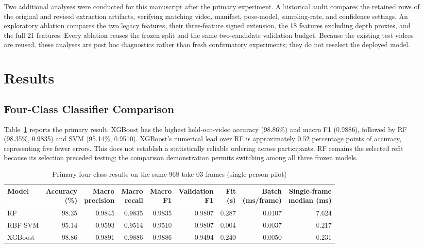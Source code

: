 \documentclass[conference]{IEEEtran}
\newcommand{\smalltable}{\setlength{\tabcolsep}{3.5pt}\renewcommand{\arraystretch}{1.12}\footnotesize}
\begin{document}
Two additional analyses were conducted for this manuscript after the primary experiment. A historical audit compares the retained rows of the original and revised extraction artifacts, verifying matching video, manifest, pose-model, sampling-rate, and confidence settings. An exploratory ablation compares the two legacy features, their three-feature signed extension, the 18 features excluding depth proxies, and the full 21 features. Every ablation reuses the frozen split and the same two-candidate validation budget. Because the existing test videos are reused, these analyses are post hoc diagnostics rather than fresh confirmatory experiments; they do not reselect the deployed model.

\section{Results}
\subsection{Four-Class Classifier Comparison}
Table~\ref{tab:performance} reports the primary result. XGBoost has the highest held-out-video accuracy (98.86\%) and macro F1 (0.9886), followed by RF (98.35\%, 0.9835) and SVM (95.14\%, 0.9510). XGBoost's numerical lead over RF is approximately 0.52 percentage points of accuracy, representing five fewer errors. This does not establish a statistically reliable ordering across participants. RF remains the selected refit because its selection preceded testing; the comparison demonstration permits switching among all three frozen models.

\begin{table}[t]\caption{Primary four-class results on the same 968 take-03 frames (single-person pilot)}\label{tab:performance}\centering\smalltable
\begin{tabular}{lrrrrrrrr}\toprule Model & \shortstack{Accuracy\\(\%)} & \shortstack{Macro\\precision} & \shortstack{Macro\\recall} & \shortstack{Macro\\F1} & \shortstack{Validation\\F1} & \shortstack{Fit\\(s)} & \shortstack{Batch\\(ms/frame)} & \shortstack{Single-frame\\median (ms)}\\\midrule
RF & 98.35 & 0.9845 & 0.9835 & 0.9835 & 0.9807 & 0.287 & 0.0107 & 7.624\\
RBF SVM & 95.14 & 0.9593 & 0.9514 & 0.9510 & 0.9807 & 0.004 & 0.0037 & 0.217\\
XGBoost & 98.86 & 0.9891 & 0.9886 & 0.9886 & 0.9494 & 0.240 & 0.0050 & 0.231\\\bottomrule
\end{tabular}\end{table}
\end{document}
